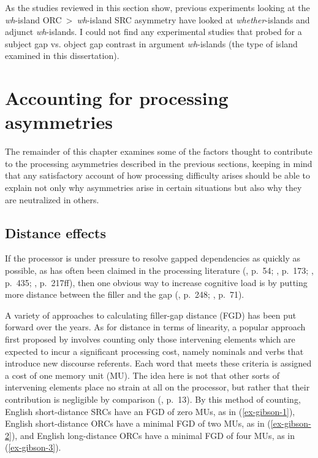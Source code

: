As the studies reviewed in this section show, previous experiments looking at the \textit{wh}-island ORC~>~\textit{wh}-island SRC asymmetry have looked at \textit{whether}-islands and adjunct \textit{wh}-islands. I could not find any experimental studies that probed for a subject gap vs. object gap contrast in argument \textit{wh}-islands (the type of island examined in this dissertation).

\section{Accounting for processing asymmetries}\label{gap-explanation}

The remainder of this chapter examines some of the factors thought to contribute to the processing asymmetries described in the previous sections, keeping in mind that any satisfactory account of how processing difficulty arises should be able to explain not only why asymmetries arise in certain situations but also why they are neutralized in others.

\subsection{Distance effects}\label{gap-distance}

If the processor is under pressure to resolve gapped dependencies as quickly as possible, as has often been claimed in the processing literature (\cite{gibson1998}, p.~54; \cite{hawkins2004}, p.~173; \cite{ogrady.etal2003}, p.~435; \cite{sag.etal2007}, p.~217ff), then one obvious way to increase cognitive load is by putting more distance between the filler and the gap (\cite{hawkins1999}, p.~248; \cite{tarallo.myhill1983}, p.~71).

A variety of approaches to calculating filler-gap distance (FGD) has been put forward over the years. As for distance in terms of linearity, a popular approach first proposed by \textcite{gibson1998,gibson2000} involves counting only those intervening elements which are expected to incur a significant processing cost, namely nominals and verbs that introduce new discourse referents. Each word that meets these criteria is assigned a cost of one memory unit (MU). The idea here is not that other sorts of intervening elements place no strain at all on the processor, but rather that their contribution is negligible by comparison (\cite{gibson1998}, p.~13). By this method of counting, English short-distance SRCs have an FGD of zero MUs, as in (\ref{ex-gibson-1}), English short-distance ORCs have a minimal FGD of two MUs, as in (\ref{ex-gibson-2}), and English long-distance ORCs have a minimal FGD of four MUs, as in (\ref{ex-gibson-3}).

